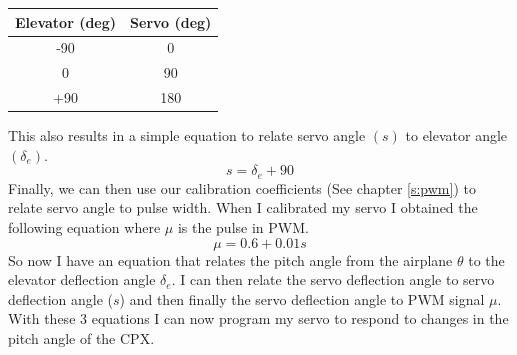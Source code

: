 \begin{table}[H]
\begin{center}
\begin{tabular}{|c|c|}
\hline
Elevator (deg) & Servo (deg)\\
\hline
-90 & 0 \\
\hline
0 & 90 \\
\hline
+90 & 180 \\
\hline
\end{tabular}
\end{center}
\end{table}
This also results in a simple equation to relate servo angle $(s)$ to elevator angle $(\delta_e)$.
\begin{equation}
s = \delta_e + 90
\end{equation}
Finally, we can then use our calibration coefficients (See chapter \ref{s:pwm}) to relate servo angle to pulse width. When I calibrated my servo I obtained the following equation where $\mu$ is the pulse in PWM.
\begin{equation}
\mu = 0.6 + 0.01s
\end{equation}
So now I have an equation that relates the pitch angle from the airplane $\theta$ to the elevator deflection angle $\delta_e$. I can then relate the servo deflection angle to servo deflection angle ($s$) and then finally the servo deflection angle to PWM signal $\mu$. With these 3 equations I can now program my servo to respond to changes in the pitch angle of the CPX. 

